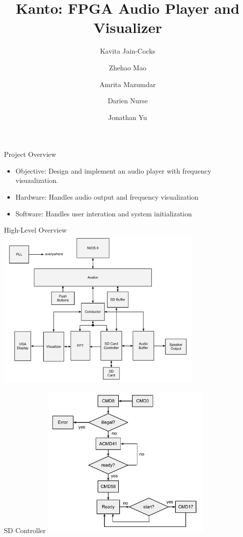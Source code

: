 \documentclass{beamer}
\title{Kanto: FPGA Audio Player and Visualizer}
\author{
  Kavita Jain-Cocks
  \and
  Zhehao Mao
  \and
  Amrita Mazumdar
  \and
  Darien Nurse
  \and
  Jonathan Yu}
\begin{document}
\begin{frame}
	\titlepage
\end{frame}

\begin{frame}{Project Overview}
	\begin{itemize}
		\item Objective: Design and implement an audio player with frequency visuzalization.
		\item Hardware: Handles audio output and frequency visualization
		\item Software: Handles user interation and system initialization
	\end{itemize}
\end{frame}

\begin{frame}{High-Level Overview}
	\centering
	\includegraphics[width=4in]{top_level}
\end{frame}

\begin{frame}{SD Controller}
	\centering
	\includegraphics[height=3in]{sd-controller}
\end{frame}
\end{document}
